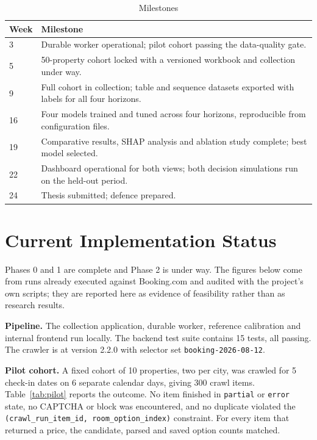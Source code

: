 \begin{table}[!htbp]
\centering
\caption{Milestones}
\label{tab:milestones}
\begin{tabular}{|p{2.2cm}|p{11.4cm}|}
\hline
\textbf{Week} & \textbf{Milestone} \\
\hline
3 & Durable worker operational; pilot cohort passing the data-quality gate. \\
\hline
5 & 50-property cohort locked with a versioned workbook and collection under way. \\
\hline
9 & Full cohort in collection; table and sequence datasets exported with labels for all four horizons. \\
\hline
16 & Four models trained and tuned across four horizons, reproducible from configuration files. \\
\hline
19 & Comparative results, SHAP analysis and ablation study complete; best model selected. \\
\hline
22 & Dashboard operational for both views; both decision simulations run on the held-out period. \\
\hline
24 & Thesis submitted; defence prepared. \\
\hline
\end{tabular}
\end{table}

\section{Current Implementation Status}
\label{sec:current_status}

Phases 0 and 1 are complete and Phase 2 is under way. The figures below come from runs already executed against Booking.com and audited with the project's own scripts; they are reported here as evidence of feasibility rather than as research results.

\textbf{Pipeline.} The collection application, durable worker, reference calibration and internal frontend run locally. The backend test suite contains 15 tests, all passing. The crawler is at version 2.2.0 with selector set \texttt{booking-2026-08-12}.

\textbf{Pilot cohort.} A fixed cohort of 10 properties, two per city, was crawled for 5 check-in dates on 6 separate calendar days, giving 300 crawl items. Table~\ref{tab:pilot} reports the outcome. No item finished in \texttt{partial} or \texttt{error} state, no CAPTCHA or block was encountered, and no duplicate violated the \texttt{(crawl\_run\_item\_id, room\_option\_index)} constraint. For every item that returned a price, the candidate, parsed and saved option counts matched.

